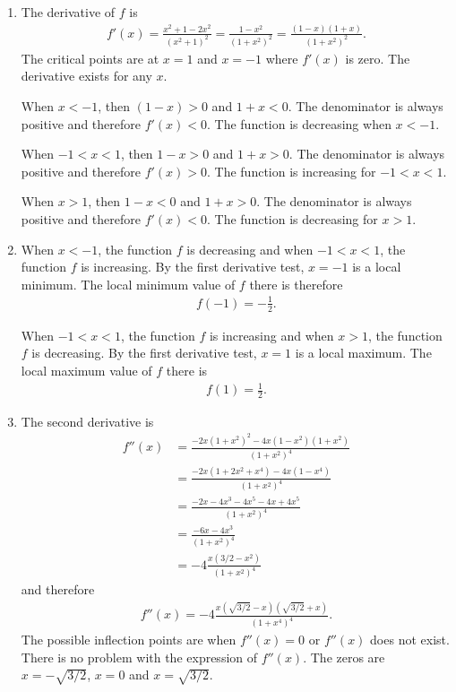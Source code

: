 	\begin{enumerate}[label=(\alph*)]
	\item The derivative of $f$ is
		\begin{align*}
		f'(x) = \frac{x^2 + 1 - 2x^2}{(x^2 + 1)^2} = \frac{1 - x^2}{(1 + x^2)^2} = \frac{(1 - x)(1 + x)}{(1 + x^2)^2} .
		\end{align*}
	The critical points are at $x = 1$ and $x = -1$ where $f'(x)$ is zero. The derivative exists for any $x$. 
	
	When $x < -1$, then $(1 - x) > 0$ and $1 + x < 0$. The denominator is always positive and therefore $f'(x) < 0$. The function is decreasing when $x < -1$.
	
	When $-1 < x < 1$, then $1 - x > 0$ and $1 + x > 0$. The denominator is always positive and therefore $f'(x) > 0$. The function is increasing for $-1 < x < 1$.
	
	When $x > 1$, then $1 - x < 0$ and $1 + x > 0$. The denominator is always positive and therefore $f'(x) < 0$. The function is decreasing for $x > 1$.
	
	\item When $x < -1$, the function $f$ is decreasing and when $-1 < x < 1$, the function $f$ is increasing. By the first derivative test, $x = -1$ is a local minimum. The local minimum value of $f$ there is therefore 
		\begin{align*}
		f(-1) = -\frac{1}{2} .
		\end{align*}
	
	When $-1 < x < 1$, the function $f$ is increasing and when $x > 1$, the function $f$ is decreasing. By the first derivative test, $x = 1$ is a local maximum. The local maximum value of $f$ there is
		\begin{align*}
		f (1) = \frac{1}{2} .
		\end{align*}
		
	\item The second derivative is
		\begin{align*}
		f''(x) &= \frac{-2x (1 + x^2)^2 - 4x (1 - x^2) (1 + x^2)}{(1 + x^2)^4} \\
		&= \frac{-2x (1 + 2x^2 + x^4) - 4x (1 - x^4)}{(1 + x^2)^4} \\
		&= \frac{-2x - 4x^3 - 4x^5 - 4x + 4x^5}{(1 + x^2)^4} \\
		&= \frac{-6x - 4x^3}{(1 + x^2)^4} \\
		&= -4\frac{x (3/2 - x^2)}{(1 + x^2)^4}
		\end{align*}
	and therefore 
		\begin{align*}
		f''(x) = -4 \frac{x (\sqrt{3/2} -  x) (\sqrt{3/2} + x)}{(1 + x^4)^4} .
		\end{align*}
	The possible inflection points are when $f''(x) = 0$ or $f''(x)$ does not exist. There is no problem with the expression of $f''(x)$. The zeros are $x = -\sqrt{3/2}$, $x =0$ and $x = \sqrt{3/2}$.
	

\end{enumerate}
